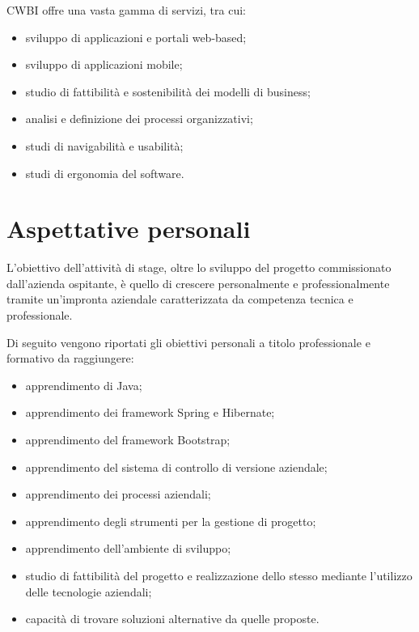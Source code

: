 \setlength{\parskip}{3ex}

\pagebreak

\noindent CWBI offre una vasta gamma di servizi, tra cui:
\begin{itemize}
\item sviluppo di applicazioni e portali web-based;
\item sviluppo di applicazioni mobile;
\item studio di fattibilità e sostenibilità dei modelli di business;
\item analisi e definizione dei processi organizzativi;
\item studi di navigabilità e usabilità;
\item studi di ergonomia del software.
\end{itemize}

\section{Aspettative personali}
L'obiettivo dell'attività di stage, oltre lo sviluppo del progetto commissionato dall'azienda ospitante, è quello di crescere personalmente e professionalmente tramite un'impronta aziendale caratterizzata da competenza tecnica e professionale.

\setlength{\parskip}{3ex}

\noindent Di seguito vengono riportati gli obiettivi personali a titolo professionale e formativo da raggiungere:
\begin{itemize}
\item apprendimento di Java;
\item apprendimento dei framework Spring e Hibernate;
\item apprendimento del framework Bootstrap;
\item apprendimento del sistema di controllo di versione aziendale;
\item apprendimento dei processi aziendali;
\item apprendimento degli strumenti per la gestione di progetto;
\item apprendimento dell’ambiente di sviluppo;
\item studio di fattibilità del progetto e realizzazione dello stesso mediante l'utilizzo delle tecnologie aziendali;
\item capacità di trovare soluzioni alternative da quelle proposte.
\end{itemize}

\pagebreak

